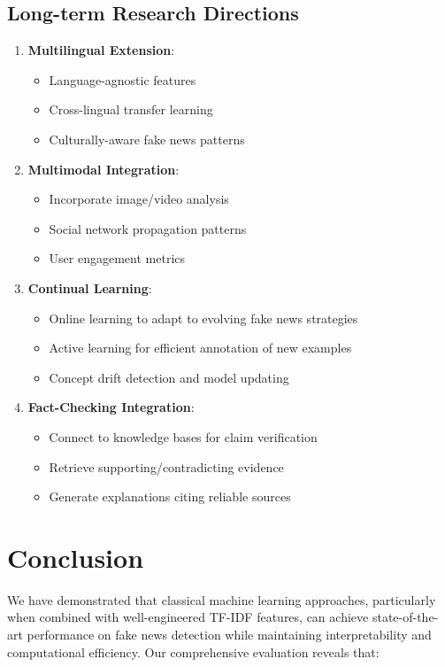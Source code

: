 \documentclass[11pt]{article}
\begin{document}
\subsection{Long-term Research Directions}
\begin{enumerate}
\item \textbf{Multilingual Extension}:
   \begin{itemize}
   \item Language-agnostic features
   \item Cross-lingual transfer learning
   \item Culturally-aware fake news patterns
   \end{itemize}

\item \textbf{Multimodal Integration}:
   \begin{itemize}
   \item Incorporate image/video analysis
   \item Social network propagation patterns
   \item User engagement metrics
   \end{itemize}

\item \textbf{Continual Learning}:
   \begin{itemize}
   \item Online learning to adapt to evolving fake news strategies
   \item Active learning for efficient annotation of new examples
   \item Concept drift detection and model updating
   \end{itemize}

\item \textbf{Fact-Checking Integration}:
   \begin{itemize}
   \item Connect to knowledge bases for claim verification
   \item Retrieve supporting/contradicting evidence
   \item Generate explanations citing reliable sources
   \end{itemize}
\end{enumerate}

\section{Conclusion}
We have demonstrated that classical machine learning approaches, particularly when combined with well-engineered TF-IDF features, can achieve state-of-the-art performance on fake news detection while maintaining interpretability and computational efficiency. Our comprehensive evaluation reveals that:
\end{document}
